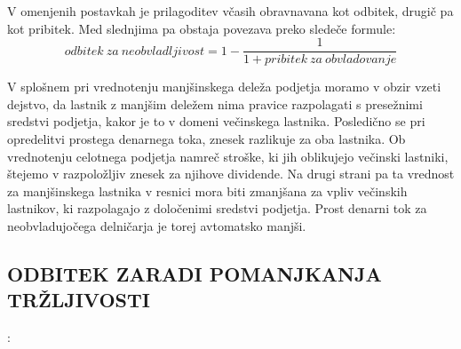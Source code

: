\documentclass[12pt,a4paper]{amsart}
\theoremstyle{definition} %
\theoremstyle{plain} %
\begin{document}
V omenjenih postavkah je prilagoditev včasih obravnavana kot odbitek, drugič pa kot pribitek. Med slednjima pa obstaja povezava preko sledeče formule:
\begin{equation}
odbitek\ za\ neobvladljivost=1-\frac{1}{1+pribitek\ za\ obvladovanje}
\end{equation}

V splošnem pri vrednotenju manjšinskega deleža podjetja moramo v obzir vzeti dejstvo, da lastnik z manjšim deležem nima pravice razpolagati s presežnimi sredstvi podjetja, kakor je to v domeni večinskega lastnika. Posledično se pri opredelitvi prostega denarnega toka, znesek razlikuje za oba lastnika. Ob vrednotenju celotnega podjetja namreč stroške, ki jih oblikujejo večinski lastniki, štejemo v razpoložljiv znesek za njihove dividende. Na drugi strani pa ta vrednost za manjšinskega lastnika v resnici mora biti zmanjšana za vpliv večinskih lastnikov, ki razpolagajo z določenimi sredstvi podjetja. Prost denarni tok za neobvladujočega delničarja je torej avtomatsko manjši.


\subsection{ODBITEK ZARADI POMANJKANJA TRŽLJIVOSTI}:\\
\end{document}
